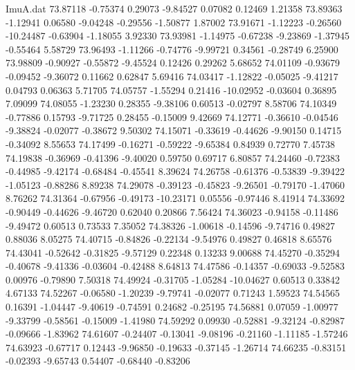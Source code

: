 \begin{filecontents}{ImuA.dat}
  73.87118   -0.75374    0.29073   -9.84527    0.07082    0.12469    1.21358
  73.89363   -1.12941    0.06580   -9.04248   -0.29556   -1.50877    1.87002
  73.91671   -1.12223   -0.26560  -10.24487   -0.63904   -1.18055    3.92330
  73.93981   -1.14975   -0.67238   -9.23869   -1.37945   -0.55464    5.58729
  73.96493   -1.11266   -0.74776   -9.99721    0.34561   -0.28749    6.25900
  73.98809   -0.90927   -0.55872   -9.45524    0.12426    0.29262    5.68652
  74.01109   -0.93679   -0.09452   -9.36072    0.11662    0.62847    5.69416
  74.03417   -1.12822   -0.05025   -9.41217    0.04793    0.06363    5.71705
  74.05757   -1.55294    0.21416  -10.02952   -0.03604    0.36895    7.09099
  74.08055   -1.23230    0.28355   -9.38106    0.60513   -0.02797    8.58706
  74.10349   -0.77886    0.15793   -9.71725    0.28455   -0.15009    9.42669
  74.12771   -0.36610   -0.04546   -9.38824   -0.02077   -0.38672    9.50302
  74.15071   -0.33619   -0.44626   -9.90150    0.14715   -0.34092    8.55653
  74.17499   -0.16271   -0.59222   -9.65384    0.84939    0.72770    7.45738
  74.19838   -0.36969   -0.41396   -9.40020    0.59750    0.69717    6.80857
  74.24460   -0.72383   -0.44985   -9.42174   -0.68484   -0.45541    8.39624
  74.26758   -0.61376   -0.53839   -9.39422   -1.05123   -0.88286    8.89238
  74.29078   -0.39123   -0.45823   -9.26501   -0.79170   -1.47060    8.76262
  74.31364   -0.67956   -0.49173  -10.23171    0.05556   -0.97446    8.41914
  74.33692   -0.90449   -0.44626   -9.46720    0.62040    0.20866    7.56424
  74.36023   -0.94158   -0.11486   -9.49472    0.60513    0.73533    7.35052
  74.38326   -1.00618   -0.14596   -9.74716    0.49827    0.88036    8.05275
  74.40715   -0.84826   -0.22134   -9.54976    0.49827    0.46818    8.65576
  74.43041   -0.52642   -0.31825   -9.57129    0.22348    0.13233    9.00688
  74.45270   -0.35294   -0.40678   -9.41336   -0.03604   -0.42488    8.64813
  74.47586   -0.14357   -0.69033   -9.52583    0.00976   -0.79890    7.50318
  74.49924   -0.31705   -1.05284  -10.04627    0.60513    0.33842    4.67133
  74.52267   -0.06580   -1.20239   -9.79741   -0.02077    0.71243    1.59523
  74.54565    0.16391   -1.04447   -9.40619   -0.74591    0.24682   -0.25195
  74.56881    0.07059   -1.00977   -9.33799   -0.58561   -0.15009   -1.41980
  74.59292    0.09930   -0.52881   -9.32124   -0.82987   -0.09666   -1.83962
  74.61607   -0.24407   -0.13041   -9.08196   -0.21160   -1.11185   -1.57246
  74.63923   -0.67717    0.12443   -9.96850   -0.19633   -0.37145   -1.26714
  74.66235   -0.83151   -0.02393   -9.65743    0.54407   -0.68440   -0.83206

\end{filecontents}

